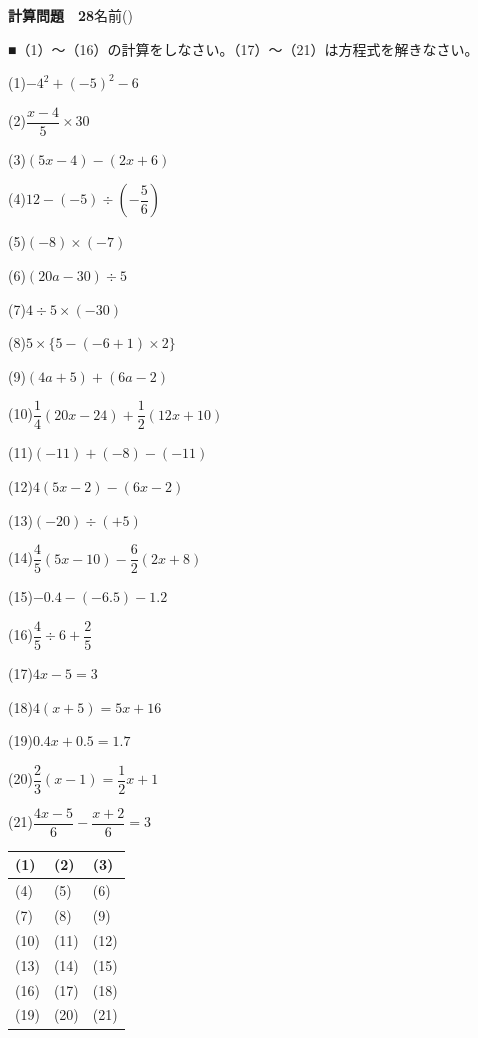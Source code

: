 \documentclass[a4paper,11pt]{ltjsarticle}
\newlength{\qcol}\setlength{\qcol}{0.47\textwidth}
\newlength{\qgap}
\newlength{\anscolw}\setlength{\anscolw}{0.30\textwidth}
\newlength{\ansh}
\newcommand{\Q}[2]{\parbox[t]{\qcol}{\raggedright (#1)\hspace{0.6em}$\displaystyle #2$}}
\newcommand{\QR}[4]{\Q{#1}{#2}\hfill\Q{#3}{#4}\par\vspace{\qgap}}
\newcommand{\anscell}[1]{\rule[-\ansdrop]{0pt}{\ansh}(#1)}
\newlength{\ansdrop}
\begin{document}
{\large\bfseries 計算問題　28}\hfill 名前(\underline{\hspace{32mm}})\par\vspace{3mm}
■（1）〜（16）の計算をしなさい。（17）〜（21）は方程式を解きなさい。\par\vspace{3mm}
\setlength{\qgap}{5.4mm}
\QR{1}{-4^2+(-5)^2-6}{2}{\dfrac{x-4}{5}\times30}
\QR{3}{(5x-4)-(2x+6)}{4}{12-(-5)\div\left(-\dfrac{5}{6}\right)}
\QR{5}{(-8)\times(-7)}{6}{(20a-30)\div5}
\QR{7}{4\div5\times(-30)}{8}{5\times\{5-(-6+1)\times2\}}
\QR{9}{(4a+5)+(6a-2)}{10}{\dfrac{1}{4}(20x-24)+\dfrac{1}{2}(12x+10)}
\QR{11}{(-11)+(-8)-(-11)}{12}{4(5x-2)-(6x-2)}
\QR{13}{(-20)\div(+5)}{14}{\dfrac{4}{5}(5x-10)-\dfrac{6}{2}(2x+8)}
\QR{15}{-0.4-(-6.5)-1.2}{16}{\dfrac{4}{5}\div6+\dfrac{2}{5}}
\QR{17}{4x-5=3}{18}{4(x+5)=5x+16}
\QR{19}{0.4x+0.5=1.7}{20}{\dfrac{2}{3}(x-1)=\dfrac{1}{2}x+1}
\vspace{1mm}
\Q{21}{\dfrac{4x-5}{6}-\dfrac{x+2}{6}=3}\par\vspace{3mm}
\setlength{\ansh}{9.5mm}\setlength{\ansdrop}{6mm}%
\begin{center}\begin{tabular}{|p{\anscolw}|p{\anscolw}|p{\anscolw}|}\hline
\anscell{1} & \anscell{2} & \anscell{3} \\\hline
\anscell{4} & \anscell{5} & \anscell{6} \\\hline
\anscell{7} & \anscell{8} & \anscell{9} \\\hline
\anscell{10} & \anscell{11} & \anscell{12} \\\hline
\anscell{13} & \anscell{14} & \anscell{15} \\\hline
\anscell{16} & \anscell{17} & \anscell{18} \\\hline
\anscell{19} & \anscell{20} & \anscell{21} \\\hline
\end{tabular}\end{center}
\end{document}
